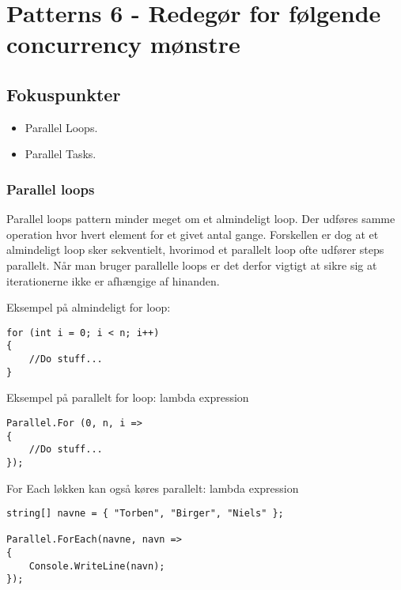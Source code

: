 \section{Patterns 6 - Redegør for følgende concurrency mønstre}

\subsection{Fokuspunkter}

\begin{itemize}
	\item Parallel Loops.
	\item Parallel Tasks.
\end{itemize}

\subsubsection{Parallel loops}

Parallel loops pattern minder meget om et almindeligt loop. Der udføres samme operation hvor hvert element for et givet antal gange. Forskellen er dog at et almindeligt loop sker sekventielt, hvorimod et parallelt loop ofte udfører steps parallelt. Når man bruger parallelle loops er det derfor vigtigt at sikre sig at iterationerne ikke er afhængige af hinanden.

Eksempel på almindeligt for loop:

\begin{lstlisting}[caption=Normal for loop, label=code:normalLoop]
for (int i = 0; i < n; i++)
{
	//Do stuff...
}
\end{lstlisting}

Eksempel på parallelt for loop: lambda expression

\begin{lstlisting}[caption=Parallel for loop,  label=code:paraLoop,
morekeywords={Parallel, For}]
Parallel.For (0, n, i =>
{
	//Do stuff...
});
\end{lstlisting}

For Each løkken kan også køres parallelt: lambda expression

\begin{lstlisting}[caption=Parallelt for each loop, label=paraForEach,morekeywords={string,Parallel, ForEach, WriteLine}]
string[] navne = { "Torben", "Birger", "Niels" };

Parallel.ForEach(navne, navn =>
{
	Console.WriteLine(navn);
});
\end{lstlisting}

